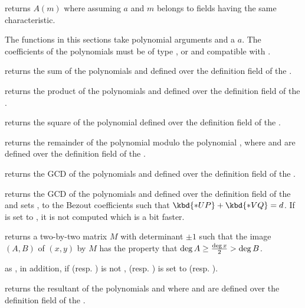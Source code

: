  returns $A(m)$ where  assuming
$a$ and $m$ belongs to fields having the same characteristic.


The functions in this sections take polynomial arguments and a 
$a$. The coefficients of the polynomials must be of type ,
 or  and compatible with .

 returns the sum of the polynomials
 and  defined over the definition field of the 
.

 returns the product of the polynomials
 and  defined over the definition field of the 
.

 returns the square of the polynomial
 defined over the definition field of the  .

 returns the remainder
of the polynomial  modulo the polynomial , where  and
 are defined over the definition field of the  .

 returns the GCD of the polynomials
 and  defined over the definition field of the 
.

returns the GCD of the polynomials  and  defined over
the definition field of the   and sets ,  to
the Bezout coefficients such that $\kbd{*UP} + \kbd{*VQ} = d$.  If  is
set to , it is not computed which is a bit faster.

 returns a two-by-two matrix
$M$ with determinant $\pm 1$ such that the image $(A,B)$ of $(x,y)$ by $M$
has the property that $\deg A \geq {\deg x \over 2} > \deg B$.

as , in addition, if  (resp. ) is not
,  (resp. ) is set to  (resp. ).

 returns the resultant of the polynomials
 and  where  and  are defined over the definition
field of the  .

